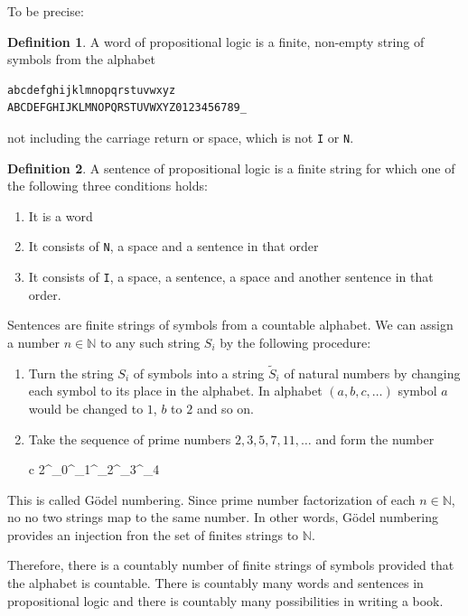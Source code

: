 \documentclass[11pt,oneside,%
]{memoir}
\newenvironment{eqna}{\begin{IEEEeqnarray}{c}}{\end{IEEEeqnarray}\ignorespacesafterend}
\theoremstyle{definition}
\newtheorem{maaritelma}{Definition}
\newcommand{\NN}{\mathbb{N}}
\begin{document}
To be precise:
\begin{maaritelma}
A word of propositional logic is a finite, non-empty string of symbols from the alphabet
\begin{lstlisting}
abcdefghijklmnopqrstuvwxyz
ABCDEFGHIJKLMNOPQRSTUVWXYZ0123456789_
\end{lstlisting}
not including the carriage return or space, which is not \lstinline[language=propositio]!I! or \lstinline[language=propositio]!N!.
\end{maaritelma}%
\begin{maaritelma}
A sentence of propositional logic is a finite string for which one of the following three conditions holds:
\begin{enumerate}
    \item It is a word
    \item It consists of \lstinline[language=propositio]!N!, a space and a sentence in that order
    \item It consists of \lstinline[language=propositio]!I!, a space, a sentence, a space and another sentence in that order.
\end{enumerate}
\end{maaritelma}
Sentences are finite strings of symbols from a countable alphabet. We can assign a number \(n\in\NN\) to any such string \(S_i\) by the following procedure:
\begin{enumerate}
    \item Turn the string \(S_i\) of symbols into a string \(\tilde{S}_i\) of natural numbers by changing each symbol to its place in the alphabet. In alphabet \((a,b,c,\dotsc)\) symbol \(a\) would be changed to \(1\), \(b\) to \(2\) and so on.
    \item Take the sequence of prime numbers \(2,3,5,7,11,\dotsc\) and form the number
        \begin{eqna}
            2^{_0}^{_1}^{_2}^{_3}^{_4}\cdot\dotsb
        \end{eqna}
\end{enumerate}
This is called Gödel numbering. Since prime number factorization of each \(n\in\NN\), no no two strings map to the same number. In other words, Gödel numbering provides an injection fron the set of finites strings to \(\NN\).

Therefore, there is a countably number of finite strings of symbols provided that the alphabet is countable. There is countably many words and sentences in propositional logic and there is countably many possibilities in writing a book.
\end{document}
